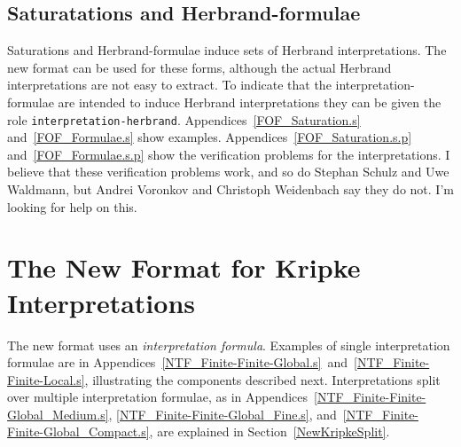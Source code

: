 \documentclass{easychair}
\begin{document}
\subsection{Saturatations and Herbrand-formulae}
\label{NewHerbrand}

Saturations and Herbrand-formulae induce sets of Herbrand interpretations.
The new format can be used for these forms, although the actual Herbrand interpretations are
not easy to extract.
To indicate that the interpretation-formulae are intended to induce Herbrand interpretations they
can be given the role {\tt interpretation-herbrand}.
Appendices~\ref{FOF_Saturation.s} and~\ref{FOF_Formulae.s} show examples.
Appendices~\ref{FOF_Saturation.s.p} and~\ref{FOF_Formulae.s.p} show the verification problems for 
the interpretations.
I believe that these verification problems work, and so do Stephan Schulz and Uwe Waldmann,
but Andrei Voronkov and Christoph Weidenbach say they do not.
I'm looking for help on this.

\section{The New Format for Kripke Interpretations}
\label{NewKripke}
 
The new format uses an {\em interpretation formula}. 
Examples of single interpretation formulae are in 
Appendices~\ref{NTF_Finite-Finite-Global.s}~and~\ref{NTF_Finite-Finite-Local.s}, 
illustrating the components described next. 
Interpretations split over multiple interpretation formulae, as in 
Appendices~\ref{NTF_Finite-Finite-Global_Medium.s}, \ref{NTF_Finite-Finite-Global_Fine.s}, 
and~\ref{NTF_Finite-Finite-Global_Compact.s}, are explained in Section~\ref{NewKripkeSplit}.
\end{document}
